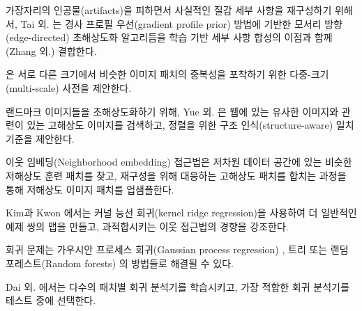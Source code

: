 \documentclass[10pt,twocolumn,letterpaper]{article}
\newcommand{\kor}[1]{#1}
\newcommand{\eng}[1]{}
\begin{document}
\eng{
To reconstruct realistic texture detail while avoiding edge artifacts, Tai et al. \cite{Tai2010} combine an edge-directed \ac{SR} algorithm based on a gradient profile prior \cite{Sun2008} with the benefits of learning-based detail synthesis. Zhang et al.
}\kor{
가장자리의 인공물(artifacts)을 피하면서 사실적인 질감 세부 사항을 재구성하기 위해서, Tai 외. \cite{Tai2010}는 경사 프로필 우선(gradient profile prior) \cite{Sun2008} 방법에 기반한 모서리 방향(edge-directed) \ac{초해상도화} 알고리듬을 학습 기반 세부 사항 합성의 이점과 함께 (Zhang 외.) 결합한다.
} \eng{
\cite{zhang2012multi} propose a multi-scale dictionary to capture redundancies of similar image patches at different scales.
}\kor{
\cite{zhang2012multi}은 서로 다른 크기에서 비슷한 이미지 패치의 중복성을 포착하기 위한 다중-크기(multi-scale) 사전을 제안한다.
} %
\eng{
To super-resolve landmark images, Yue et al. \cite{Yue2013} retrieve correlating \ac{HR} images with similar content from the web and propose a structure-aware matching criterion for alignment.
}\kor{
랜드마크 이미지들을 초해상도화하기 위해, Yue 외. \cite{Yue2013}은 웹에 있는 유사한 이미지와 관련이 있는 \ac{고해상도} 이미지를 검색하고, 정렬을 위한 구조 인식(structure-aware) 일치 기준을 제안한다.
}

\eng{
Neighborhood embedding approaches upsample a \ac{LR} image patch by finding similar \ac{LR} training patches in a low dimensional manifold and combining their corresponding \ac{HR} patches for reconstruction \cite{timofte2013anchored,timofte2014a+}.
}\kor{
이웃 임베딩(Neighborhood embedding) 접근법은 저차원 데이터 공간에 있는 비슷한 \ac{저해상도} 훈련 패치를 찾고, 재구성을 위해 대응하는 \ac{고해상도} 패치를 합치는 과정\cite{timofte2013anchored,timofte2014a+}을 통해 \ac{저해상도} 이미지 패치를 업샘플한다.
}
\eng{
In Kim and Kwon \cite{Kim10kernelregression} the authors emphasize the tendency of neighborhood approaches to overfit and formulate a more general map of example pairs using kernel ridge regression.
}\kor{
Kim과 Kwon \cite{Kim10kernelregression}에서는 커널 능선 회귀(kernel ridge regression)을 사용하여 더 일반적인 예제 쌍의 맵을 만들고, 과적합시키는 이웃 접근법의 경향을 강조한다.
}
\eng{
The regression problem can also be solved with Gaussian process regression \cite{he2011single}, trees \cite{salvador2015naive} or Random Forests \cite{schulter2015fast}.
}\kor{
회귀 문제는 가우시안 프로세스 회귀(Gaussian process regression) \cite{he2011single}, 트리 \cite{salvador2015naive} 또는 랜덤 포레스트(Random forests) \cite{schulter2015fast}의 방법들로 해결될 수 있다.
}
\eng{
In Dai et al. \cite{dai2015jointly} a multitude of patch-specific regressors is learned and the most appropriate regressors selected during testing.
}\kor{
Dai 외. \cite{dai2015jointly}에서는 다수의 패치별 회귀 분석기를 학습시키고, 가장 적합한 회귀 분석기를 테스트 중에 선택한다.
} %
\end{document}
